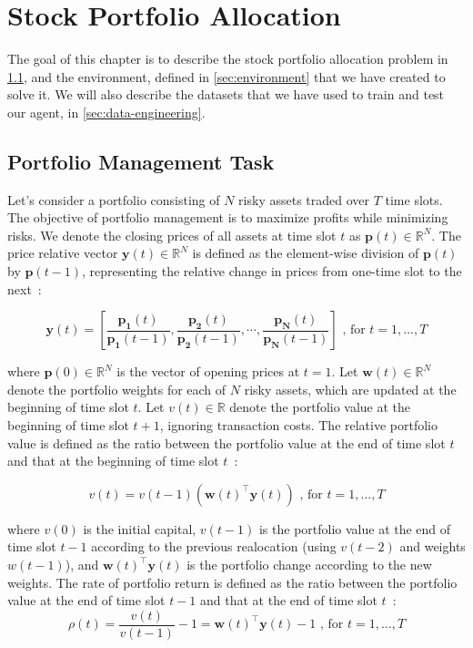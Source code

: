\documentclass[../xlapes02]{subfiles}
\begin{document}
    \chapter{Stock Portfolio Allocation}\label{sec:stock-portfolio-allocation}
    The goal of this chapter is to describe the stock portfolio allocation problem in \cref{sec:portfolio-management-task}, and the environment, defined in \cref{sec:environment} that we have created to solve it. We will also describe the datasets that we have used to train and test our agent, in \cref{sec:data-engineering}.


    \section{Portfolio Management Task}\label{sec:portfolio-management-task}
    Let's consider a portfolio consisting of $N$ risky assets traded over $T$ time slots. The objective of portfolio management is to maximize profits while minimizing risks. We denote the closing prices of all assets at time slot $t$ as $\mathbf{p}(t) \in \mathbb{R}^N$. The price relative vector $\mathbf{y}(t) \in \mathbb{R}^N$ is defined as the element-wise division of $\mathbf{p}(t)$ by $\mathbf{p}(t-1)$, representing the relative change in prices from one-time slot to the next~\cite{finrl-portfolio-allocation-2020}:

    \begin{equation}
        \mathbf{y}(t)=\left[\frac{\mathbf{p_1}(t)}{\mathbf{p_1}(t-1)}, \frac{\mathbf{p_2}(t)}{\mathbf{p_2}(t-1)}, \cdots, \frac{\mathbf{p_N}(t)}{\mathbf{p_N}(t-1)}\right]\text{ , for }t=1,\ldots,T
    \end{equation}

    where $\mathbf{p}(0) \in \mathbb{R}^N$ is the vector of opening prices at $t = 1$. Let $\mathbf{w}(t) \in \mathbb{R}^N$ denote the portfolio weights for each of $N$ risky assets, which are updated at the beginning of time slot $t$. Let $v(t) \in \mathbb{R}$ denote the portfolio value at the beginning of time slot $t+1$, ignoring transaction costs. The relative portfolio value is defined as the ratio between the portfolio value at the end of time slot $t$ and that at the beginning of time slot $t$~\cite{finrl-portfolio-allocation-2020}:

    \begin{equation}
        v(t)=v(t-1)(\mathbf{w}(t)^\top\mathbf{y}(t))\text{ , for }t=1,\ldots,T
    \end{equation}

    where $v(0)$ is the initial capital, $v(t-1)$ is the portfolio value at the end of time slot $t-1$ according to the previous realocation (using $v(t-2)$ and weights $w(t-1)$), and $\mathbf{w}(t)^\top\mathbf{y}(t)$ is the portfolio change according to the new weights. The rate of portfolio return is defined as the ratio between the portfolio value at the end of time slot $t-1$ and that at the end of time slot $t$~\cite{finrl-portfolio-allocation-2020}:
    \begin{equation}
        \rho(t)=\frac{v(t)}{v(t-1)}-1=\mathbf{w}(t)^\top\mathbf{y}(t)-1\text{ , for }t=1,\ldots,T
    \end{equation}
\end{document}
